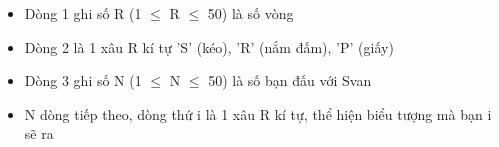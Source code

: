\begin{itemize}
	\item Dòng 1 ghi số R (1  $\le$  R  $\le$  50) là số vòng
	\item Dòng 2 là 1 xâu R kí tự 'S' (kéo), 'R' (nắm đấm), 'P' (giấy)
	\item Dòng 3 ghi số N (1  $\le$  N  $\le$  50) là số bạn đấu với Svan
	\item N dòng tiếp theo, dòng thứ i là 1 xâu R kí tự, thể hiện biểu tượng mà bạn i sẽ ra
\end{itemize}

\